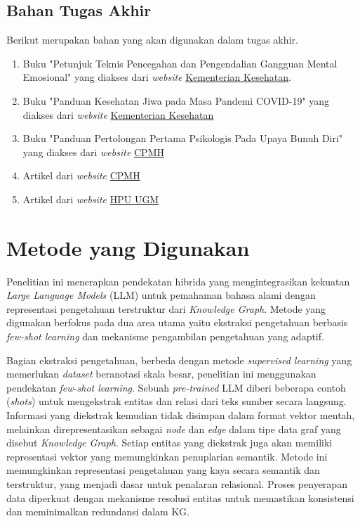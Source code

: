 \subsection{Bahan Tugas Akhir}
Berikut merupakan bahan yang akan digunakan dalam tugas akhir.
\begin{enumerate}
	\item Buku "Petunjuk Teknis Pencegahan dan Pengendalian Gangguan Mental Emosional" yang diakses dari \textit{website} \href{https://repository.kemkes.go.id/book/1258}{Kementerian Kesehatan}.
	\item Buku "Panduan Kesehatan Jiwa pada Masa Pandemi COVID-19" yang diakses dari \textit{website} \href{https://pusatkrisis.kemkes.go.id/panduan-kesehatan-jiwa-pada-masa-pandemi-covid-19}{Kementerian Kesehatan}
	\item Buku "Panduan Pertolongan Pertama Psikologis Pada Upaya Bunuh Diri" yang diakses dari \textit{website} \href{https://cpmh.psikologi.ugm.ac.id/wp-content/uploads/sites/39/2021/11/Panduan-Pertolongan-Pertama-Pencegahan-Bunuh-Diri_v1.pdf}{CPMH}
	\item Artikel dari \textit{website} \href{https://cpmh.psikologi.ugm.ac.id/}{CPMH}
	\item Artikel dari \textit{website} \href{https://hpu.ugm.ac.id}{HPU UGM}
\end{enumerate}

\section{Metode yang Digunakan}
Penelitian ini menerapkan pendekatan hibrida yang mengintegrasikan kekuatan \textit{Large Language Models} (LLM) untuk pemahaman bahasa alami dengan representasi pengetahuan terstruktur dari \textit{Knowledge Graph}.
Metode yang digunakan berfokus pada dua area utama yaitu ekstraksi pengetahuan berbasis \textit{few-shot learning} dan mekanisme pengambilan pengetahuan yang adaptif.

Bagian ekstraksi pengetahuan, berbeda dengan metode \textit{supervised learning} yang memerlukan \textit{dataset} beranotasi skala besar, penelitian ini menggunakan pendekatan \textit{few-shot learning}.
Sebuah \textit{pre-trained} LLM diberi beberapa contoh (\textit{shots}) untuk mengekstrak entitas dan relasi dari teks sumber secara langsung.
Informasi yang diekstrak kemudian tidak disimpan dalam format vektor mentah, melainkan direpresentasikan sebagai \textit{node} dan \textit{edge} dalam tipe data graf yang disebut \textit{Knowledge Graph}.
Setiap entitas yang diekstrak juga akan memiliki representasi vektor yang memungkinkan penuplarian semantik.
Metode ini memungkinkan representasi pengetahuan yang kaya secara semantik dan terstruktur, yang menjadi dasar untuk penalaran relasional.
Proses penyerapan data diperkuat dengan mekanisme resolusi entitas untuk memastikan konsistensi dan meminimalkan redundansi dalam KG.

